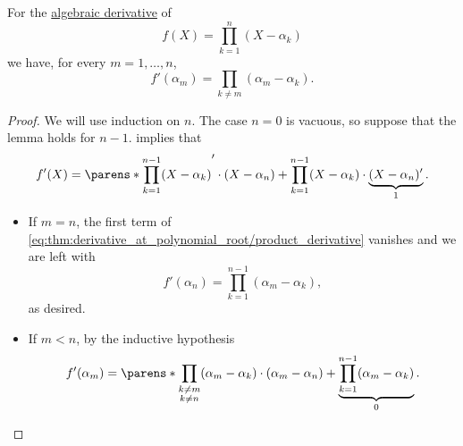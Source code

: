 \begin{lemma}\label{thm:derivative_at_polynomial_root}
  For the \hyperref[def:algebraic_derivative]{algebraic derivative} of
  \begin{equation*}
    f(X) = \prod_{k=1}^n (X - \alpha_k)
  \end{equation*}
  we have, for every \( m = 1, \ldots, n \),
  \begin{equation}\label{eq:thm:derivative_at_polynomial_root}
    f'(\alpha_m) = \prod_{k \neq m} (\alpha_m - \alpha_k).
  \end{equation}
\end{lemma}
\begin{proof}
  We will use induction on \( n \). The case \( n = 0 \) is vacuous, so suppose that the lemma holds for \( n - 1 \).  implies that
  \begin{equation}\label{eq:thm:derivative_at_polynomial_root/product_derivative}
    f'(X) = \parens*{ \prod_{k=1}^{n-1} (X - \alpha_k) }' \cdot (X - \alpha_n) + \prod_{k=1}^{n-1} (X - \alpha_k) \cdot \underbrace{(X - \alpha_n)'}_{1}.
  \end{equation}

  \begin{itemize}
    \item If \( m = n \), the first term of \eqref{eq:thm:derivative_at_polynomial_root/product_derivative} vanishes and we are left with
    \begin{equation*}
      f'(\alpha_n) = \prod_{k=1}^{n-1} (\alpha_m - \alpha_k),
    \end{equation*}
    as desired.

    \item If \( m < n \), by the inductive hypothesis
    \begin{equation*}
      f'(\alpha_m) = \parens*{ \prod_{\substack{k \neq m \\ k \neq n}} (\alpha_m - \alpha_k) } \cdot (\alpha_m - \alpha_n) + \underbrace{\prod_{k=1}^{n-1} (\alpha_m - \alpha_k)}_{0}.
    \end{equation*}
  \end{itemize}
\end{proof}

